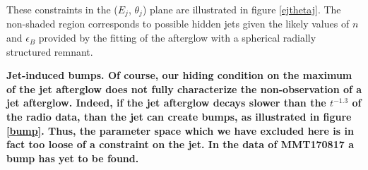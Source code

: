These constraints in the ($E_j$, $\theta_j$) plane are illustrated in figure \ref{ejthetaj}. The non-shaded region corresponds to possible hidden jets given the likely values of $n$ and $\epsilon_B$ provided by the fitting of the afterglow with a spherical radially structured remnant.



\bf{Jet-induced bumps.} Of course, our hiding condition on the maximum of the jet afterglow does not fully characterize the non-observation of a jet afterglow. Indeed, if the jet afterglow decays slower than the $t^{-1.3}$ of the radio data, than the jet can create bumps, as illustrated in figure \ref{bump}. Thus, the parameter space which we have excluded here is in fact too loose of a constraint on the jet. In the data of MMT170817 a bump has yet to be found.


